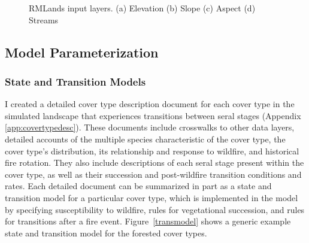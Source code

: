 \begin{figure}[!htbp]
  \centering
         \qquad

  \caption{RMLands input layers. (a) Elevation (b) Slope (c) Aspect (d) Streams}
  \label{fig:inputlayermaps2}
\end{figure}



\subsection{Model Parameterization}
\label{subsec:hrvmodelparam}

\subsubsection*{State and Transition Models}
I created a detailed cover type description document for each cover type in the simulated landscape that experiences transitions between seral stages (Appendix \ref{app:covertypedesc}). These documents include crosswalks to other data layers, detailed accounts of the multiple species characteristic of the cover type, the cover type's distribution, its relationship and response to wildfire, and historical fire rotation. They also include descriptions of each seral stage present within the cover type, as well as their succession and post-wildfire transition conditions and rates. Each detailed document can be summarized in part as a state and transition model for a particular cover type, which is implemented in the model by specifying susceptibility to wildfire, rules for vegetational succession, and rules for transitions after a fire event. Figure~\ref{transmodel} shows a generic example state and transition model for the forested cover types.

